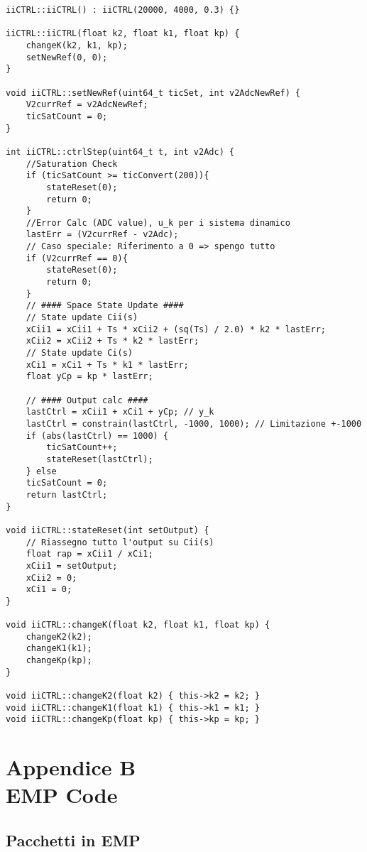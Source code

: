 \begin{lstlisting}[style=cppStyle,caption={Source Classe controllore C(s)},label=lst:controlClassCpp] 
iiCTRL::iiCTRL() : iiCTRL(20000, 4000, 0.3) {}

iiCTRL::iiCTRL(float k2, float k1, float kp) {
	changeK(k2, k1, kp);
	setNewRef(0, 0);
}

void iiCTRL::setNewRef(uint64_t ticSet, int v2AdcNewRef) {
	V2currRef = v2AdcNewRef;
	ticSatCount = 0;
}

int iiCTRL::ctrlStep(uint64_t t, int v2Adc) {
	//Saturation Check
	if (ticSatCount >= ticConvert(200)){
		stateReset(0);
		return 0;
	}
	//Error Calc (ADC value), u_k per i sistema dinamico
	lastErr = (V2currRef - v2Adc);
	// Caso speciale: Riferimento a 0 => spengo tutto
	if (V2currRef == 0){
		stateReset(0);
		return 0;
	}
	// #### Space State Update ####
	// State update Cii(s)
	xCii1 = xCii1 + Ts * xCii2 + (sq(Ts) / 2.0) * k2 * lastErr;
	xCii2 = xCii2 + Ts * k2 * lastErr;
	// State update Ci(s)
	xCi1 = xCi1 + Ts * k1 * lastErr;
	float yCp = kp * lastErr;
	
	// #### Output calc ####
	lastCtrl = xCii1 + xCi1 + yCp; // y_k
	lastCtrl = constrain(lastCtrl, -1000, 1000); // Limitazione +-1000
	if (abs(lastCtrl) == 1000) {
		ticSatCount++;
		stateReset(lastCtrl);
	} else
	ticSatCount = 0;
	return lastCtrl;
}

void iiCTRL::stateReset(int setOutput) {
	// Riassegno tutto l'output su Cii(s)
	float rap = xCii1 / xCi1;
	xCii1 = setOutput;
	xCii2 = 0;
	xCi1 = 0;
}

void iiCTRL::changeK(float k2, float k1, float kp) {
	changeK2(k2);
	changeK1(k1);
	changeKp(kp);
}

void iiCTRL::changeK2(float k2) { this->k2 = k2; }
void iiCTRL::changeK1(float k1) { this->k1 = k1; }
void iiCTRL::changeKp(float kp) { this->kp = kp; }
\end{lstlisting}



\chapter*{Appendice B\\ EMP Code} \label{EMPCode}
\setcounter{chapter}{\thechapter + 1}

\section{Pacchetti in EMP}
